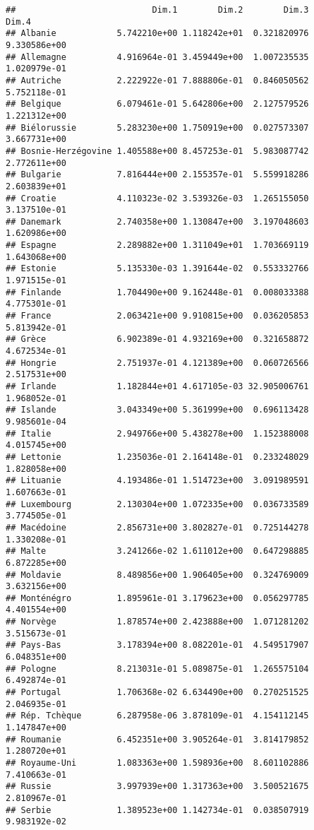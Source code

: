 \documentclass[
]{article}
\begin{document}
\begin{verbatim}
##                           Dim.1        Dim.2        Dim.3        Dim.4
## Albanie            5.742210e+00 1.118242e+01  0.321820976 9.330586e+00
## Allemagne          4.916964e-01 3.459449e+00  1.007235535 1.020979e-01
## Autriche           2.222922e-01 7.888806e-01  0.846050562 5.752118e-01
## Belgique           6.079461e-01 5.642806e+00  2.127579526 1.221312e+00
## Biélorussie        5.283230e+00 1.750919e+00  0.027573307 3.667731e+00
## Bosnie-Herzégovine 1.405588e+00 8.457253e-01  5.983087742 2.772611e+00
## Bulgarie           7.816444e+00 2.155357e-01  5.559918286 2.603839e+01
## Croatie            4.110323e-02 3.539326e-03  1.265155050 3.137510e-01
## Danemark           2.740358e+00 1.130847e+00  3.197048603 1.620986e+00
## Espagne            2.289882e+00 1.311049e+01  1.703669119 1.643068e+00
## Estonie            5.135330e-03 1.391644e-02  0.553332766 1.971515e-01
## Finlande           1.704490e+00 9.162448e-01  0.008033388 4.775301e-01
## France             2.063421e+00 9.910815e+00  0.036205853 5.813942e-01
## Grèce              6.902389e-01 4.932169e+00  0.321658872 4.672534e-01
## Hongrie            2.751937e-01 4.121389e+00  0.060726566 2.517531e+00
## Irlande            1.182844e+01 4.617105e-03 32.905006761 1.968052e-01
## Islande            3.043349e+00 5.361999e+00  0.696113428 9.985601e-04
## Italie             2.949766e+00 5.438278e+00  1.152388008 4.015745e+00
## Lettonie           1.235036e-01 2.164148e-01  0.233248029 1.828058e+00
## Lituanie           4.193486e-01 1.514723e+00  3.091989591 1.607663e-01
## Luxembourg         2.130304e+00 1.072335e+00  0.036733589 3.774505e-01
## Macédoine          2.856731e+00 3.802827e-01  0.725144278 1.330208e-01
## Malte              3.241266e-02 1.611012e+00  0.647298885 6.872285e+00
## Moldavie           8.489856e+00 1.906405e+00  0.324769009 3.632156e+00
## Monténégro         1.895961e-01 3.179623e+00  0.056297785 4.401554e+00
## Norvège            1.878574e+00 2.423888e+00  1.071281202 3.515673e-01
## Pays-Bas           3.178394e+00 8.082201e-01  4.549517907 6.048351e+00
## Pologne            8.213031e-01 5.089875e-01  1.265575104 6.492874e-01
## Portugal           1.706368e-02 6.634490e+00  0.270251525 2.046935e-01
## Rép. Tchèque       6.287958e-06 3.878109e-01  4.154112145 1.147847e+00
## Roumanie           6.452351e+00 3.905264e-01  3.814179852 1.280720e+01
## Royaume-Uni        1.083363e+00 1.598936e+00  8.601102886 7.410663e-01
## Russie             3.997939e+00 1.317363e+00  3.500521675 2.810967e-01
## Serbie             1.389523e+00 1.142734e-01  0.038507919 9.983192e-02

\end{verbatim}
\end{document}
